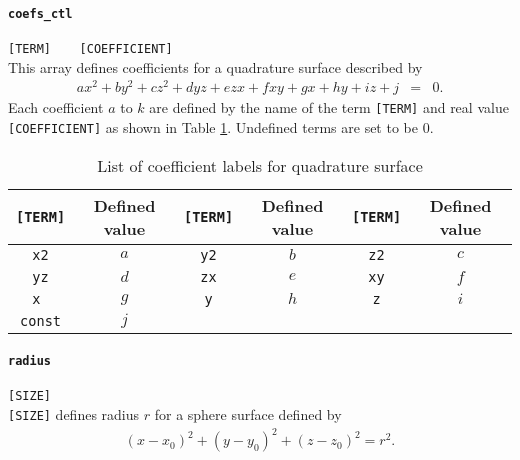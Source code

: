 \paragraph{\tt coefs\_ctl}
\label{href_t:psf_coefs_ctl}
\verb|[TERM]	[COEFFICIENT]| \\
This array defines coefficients for a quadrature surface described by 
\begin{eqnarray*}
a x^2 + b y^2 + c z^2 + d y z + e z x + f x y + g x + h y + i z + j &=& 0.
\end{eqnarray*}
Each coefficient $a$ to $k$ are defined by the name of the term \verb|[TERM]| and real value \verb|[COEFFICIENT]| as shown in Table \ref{table:psf_coefs}. Undefined terms are set to be 0.
%
\begin{table}[htp]
\caption{List of coefficient labels for quadrature surface}
\begin{center}
\begin{tabular}{|c|c||c|c||c|c|}
\hline
\verb|[TERM]| & Defined value & \verb|[TERM]| & Defined value & \verb|[TERM]| & Defined value \\ \hline
\verb|x2| & $a$ & \verb|y2| & $b$  & \verb|z2| & $c$ \\
\verb|yz| & $d$ & \verb|zx| & $e$  & \verb|xy| & $f$ \\
\verb|x | & $g$ & \verb|y| & $h$  & \verb|z| & $i$ \\
\verb|const| & $j$ &  &   & &  \\ \hline
\end{tabular}
\end{center}
\label{table:psf_coefs}
\end{table}
%

\paragraph{\tt radius}
\label{href_t:psf_radius}
\verb|[SIZE]| \\
\verb|[SIZE]| defines radius $r$ for a sphere surface defined by 
\begin{eqnarray*}
\left(x-x_{0} \right)^2 + \left(y-y_{0} \right)^2 + \left(z-z_{0} \right)^2 = r^2. 
\end{eqnarray*}

